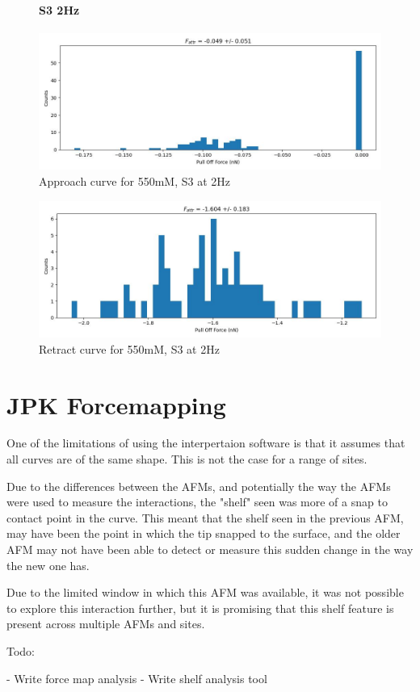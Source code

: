 \begin{figure}[h!]
\paragraph{S3 2Hz}
\centering
\includegraphics[width=\textwidth]{chapter7/Tip speed/550mM/S3 2Hz/approach_f_a_hist.jpg}
\caption{Approach curve for 550mM, S3 at 2Hz}
\end{figure}

\begin{figure}[h!]
\centering
\includegraphics[width=\textwidth]{chapter7/Tip speed/550mM/S3 2Hz/retract_f_a_hist.jpg}
\caption{Retract curve for 550mM, S3 at 2Hz}
\end{figure}




\section{JPK Forcemapping}

One of the limitations of using the interpertaion software is that it assumes that all curves are of the same shape. This is not the case for a range of sites.

Due to the differences between the AFMs, and potentially the way the AFMs were used to measure the interactions, the "shelf" seen was more of a snap to contact point in the curve. This meant that the shelf seen in the previous AFM, may have been the point in which the tip snapped to the surface, and the older AFM may not have been able to detect or measure this sudden change in the way the new one has. 

Due to the limited window in which this AFM was available, it was not possible to explore this interaction further, but it is promising that this shelf feature is present across multiple AFMs and sites.

Todo:

- Write force map analysis
- Write shelf analysis tool
